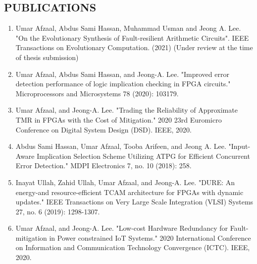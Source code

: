 \begin{center}
\section*{PUBLICATIONS}
\end{center}

\begin{enumerate}

\item Umar Afzaal, Abdus Sami Hassan, Muhammad Usman and Jeong A. Lee. "On the Evolutionary Synthesis of Fault-resilient Arithmetic Circuits". IEEE Transactions on Evolutionary Computation. (2021) (Under review at the time of thesis submission)

\item Umar Afzaal, Abdus Sami Hassan, and Jeong-A. Lee. "Improved error detection performance of logic implication checking in FPGA circuits." Microprocessors and Microsystems 78 (2020): 103179.

\item Umar Afzaal, and Jeong-A. Lee. "Trading the Reliability of Approximate TMR in FPGAs with the Cost of Mitigation." 2020 23rd Euromicro Conference on Digital System Design (DSD). IEEE, 2020.

\item Abdus Sami Hassan, Umar Afzaal, Tooba Arifeen, and Jeong A. Lee. "Input-Aware Implication Selection Scheme Utilizing ATPG for Efficient Concurrent Error Detection." MDPI Electronics 7, no. 10 (2018): 258.

\item Inayat Ullah, Zahid Ullah, Umar Afzaal, and Jeong-A. Lee. "DURE: An energy-and resource-efficient TCAM architecture for FPGAs with dynamic updates." IEEE Transactions on Very Large Scale Integration (VLSI) Systems 27, no. 6 (2019): 1298-1307.


\item Umar Afzaal, and Jeong-A. Lee. "Low-cost Hardware Redundancy for Fault-mitigation in Power constrained IoT Systems." 2020 International Conference on Information and Communication Technology Convergence (ICTC). IEEE, 2020.

\end{enumerate}




\pagebreak  %


